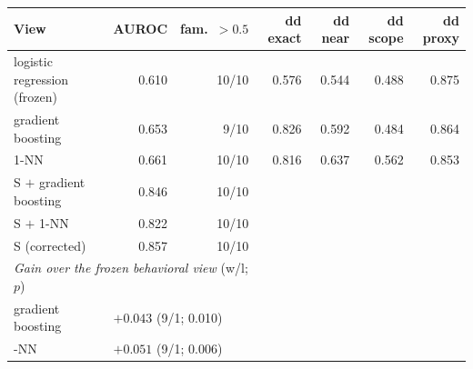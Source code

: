 \begin{tabular}{lrrrrrr}
\toprule
View & AUROC & fam.\ $>0.5$ & dd exact & dd near & dd scope & dd proxy\\
\midrule
logistic regression (frozen) & 0.610 & 10/10 & 0.576 & 0.544 & 0.488 & 0.875\\
gradient boosting & 0.653 & 9/10 & 0.826 & 0.592 & 0.484 & 0.864\\
1-NN & 0.661 & 10/10 & 0.816 & 0.637 & 0.562 & 0.853\\
S $+$ gradient boosting & 0.846 & 10/10 & & & & \\
S $+$ 1-NN & 0.822 & 10/10 & & & & \\
S (corrected) & 0.857 & 10/10 & & & & \\
\midrule
\multicolumn{3}{l}{\emph{Gain over the frozen behavioral view} (w/l; $p$)} & & & &\\
\quad gradient boosting & \multicolumn{2}{l}{$+0.043$ (9/1; 0.010)} & & & &\\
\quad 1-NN & \multicolumn{2}{l}{$+0.051$ (9/1; 0.006)} & & & &\\
\bottomrule
\end{tabular}

